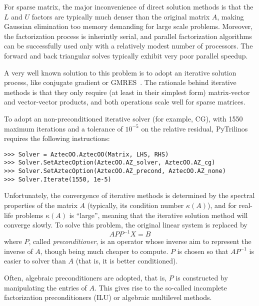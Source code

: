 \documentclass[10pt,relax]{SANDreport}
\begin{document}
\bigskip

For sparse matrix, the major inconvenience of direct solution methods is that
the $L$ and $U$ factors are typically much denser than the original matrix
$A$, making Gaussian elimination too memory demanding for large scale
problems. Moreover, the factorization process is inherintly serial, and
parallel factorization algorithms can be successfully used only with a
relatively modest number of processors. The
forward and back triangular solves typically exhibit very poor parallel speedup.

A very well known solution to this problem is to adopt an iterative solution
process, like conjugate gradient or GMRES~\cite{FIXME}. The rationale behind
iterative methods is that they only require (at least in their simplest form)
matrix-vector and vector-vector products, and both operations scale well for
sparse matrices. 

To adopt an non-preconditioned iterative solver (for example, CG), with 1550
maximum iterations and a tolerance of $10^{-5}$ on the relative residual,
  PyTrilinos requires the following instructions:
\begin{verbatim}
>>> Solver = AztecOO.AztecOO(Matrix, LHS, RHS)
>>> Solver.SetAztecOption(AztecOO.AZ_solver, AztecOO.AZ_cg)
>>> Solver.SetAztecOption(AztecOO.AZ_precond, AztecOO.AZ_none)
>>> Solver.Iterate(1550, 1e-5)
\end{verbatim}

Unfortunately, the convergence of
iterative methods is determined by the spectral properties of the matrix $A$
(typically, its condition number $\kappa(A)$), and for
real-life problems $\kappa(A)$ is ``large'', meaning that the iterative
solution method will converge slowly. To solve this problem,
the original linear system is replaced by 
\[
A P P^{-1} X = B
\]
where $P$, called {\sl preconditioner}, is an operator whose inverse aim to
represent the inverse of $A$, though being much cheaper to compute.
$P$ is chosen so that $AP^{-1}$ is easier to solver than $A$ 
(that is, it is better conditioned). 

\smallskip

Often, algebraic preconditioners are adopted, that is, $P$ is constructed by
manipulating the entries of $A$. This gives rise to the so-called incomplete
factorization preconditioners (ILU) or algebraic multilevel methods. 
\end{document}
